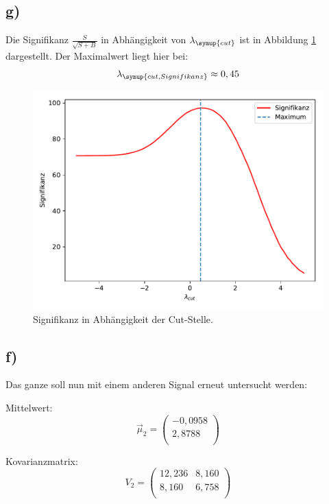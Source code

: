 \subsection{g)}
Die Signifikanz $\frac{S}{\sqrt{S+B}} $ in Abhängigkeit von $\lambda_{\symup{cut}}$ ist in Abbildung
\ref{abb:4} dargestellt.
Der Maximalwert liegt hier bei:
\begin{equation*}
  \lambda_{\symup{cut, Signifikanz}} \approx 0,45
\end{equation*}
\begin{figure}
  \centering
  \includegraphics[scale=0.7]{Aufgabe12/Signifikanz.pdf}
  \caption{Signifikanz in Abhängigkeit der Cut-Stelle.}
  \label{abb:4}
\end{figure}

\subsection{f)}
Das ganze soll nun mit einem anderen Signal erneut untersucht werden:

Mittelwert:
\begin{equation*}
  \vec{\mu}_2 = \begin{pmatrix}
                  -0,0958\\
                   2,8788\\
  \end{pmatrix}
\end{equation*}

Kovarianzmatrix:
\begin{equation*}
  V_2 = \begin{pmatrix}
                  12,236 &  8,160 \\
                  8,160 &  6,758 \\
  \end{pmatrix}
\end{equation*}

